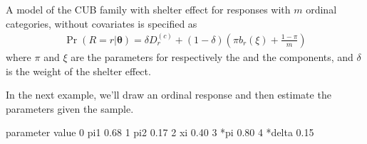 \documentclass[letterpaper,10pt,english]{sphinxmanual}
\begin{document}
\sphinxAtStartPar
A model of the CUB family with shelter effect
for responses with \(m\) ordinal categories, without covariates is specified as
\begin{equation*}
\begin{split}\Pr(R=r|\boldsymbol{\theta}) = \delta D_r^{(c)} + (1-\delta)\left(\pi b_r(\xi) + \frac{1-\pi}{m} \right)\end{split}
\end{equation*}
\sphinxAtStartPar
where \(\pi\) and \(\xi\) are the parameters for respectively the  and the
 components, and \(\delta\) is the weight of the shelter effect.

\sphinxAtStartPar
In the next example, we’ll draw an ordinal response
and then estimate the parameters given the sample.
\def\sphinxLiteralBlockLabel{\label{\detokenize{manual:id282}}}
\begin{sphinxVerbatim}[commandchars=\\\{\},numbers=left,firstnumber=1,stepnumber=1]
   
    

  
     
      
     

\end{sphinxVerbatim}

\begin{sphinxVerbatim}[commandchars=\\\{\}]
  parameter  value
0       pi1   0.68
1       pi2   0.17
2        xi   0.40
3       *pi   0.80
4    *delta   0.15
\end{sphinxVerbatim}
\end{document}
